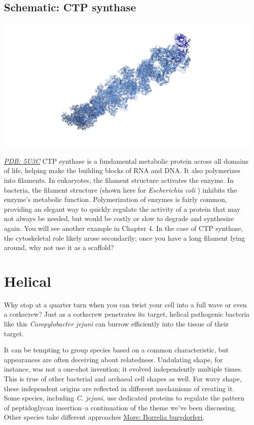\documentclass[]{tufte-book}
\begin{document}
\hypertarget{CTP_synthase}{%
\subsection*{Schematic: CTP synthase}\label{CTP_synthase}}

\includegraphics{img/schematics/3_4_1}

\href{http://rcsb.org/structure/5U3C}{\emph{PDB: 5U3C}}
CTP synthase is a fundamental metabolic protein across all domains of life, helping make the building blocks of RNA and DNA. It also polymerizes into filaments. In eukaryotes, the filament structure activates the enzyme. In bacteria, the filament structure (shown here for \emph{Escherichia coli} \citep{lynch2017}) inhibits the enzyme's metabolic function. Polymerization of enzymes is fairly common, providing an elegant way to quickly regulate the activity of a protein that may not always be needed, but would be costly or slow to degrade and synthesize again. You will see another example in Chapter 4. In the case of CTP synthase, the cytoskeletal role likely arose secondarily; once you have a long filament lying around, why not use it as a scaffold?

\hypertarget{helical}{%
\section{Helical}\label{helical}}

Why stop at a quarter turn when you can twist your cell into a full wave or even a corkscrew? Just as a corkscrew penetrates its target, helical pathogenic bacteria like this \emph{Campylobacter jejuni} can burrow efficiently into the tissue of their target.

It can be tempting to group species based on a common characteristic, but appearances are often deceiving about relatedness. Undulating shape, for instance, was not a one-shot invention; it evolved independently multiple times. This is true of other bacterial and archaeal cell shapes as well. For wavy shape, these independent origins are reflected in different mechanisms of creating it. Some species, including \emph{C. jejuni}, use dedicated proteins to regulate the pattern of peptidoglycan insertion--a continuation of the theme we've been discussing. Other species take different approaches \protect\hyperlink{Borrelia_burgdorferi}{More: Borrelia burgdorferi}.
\end{document}
